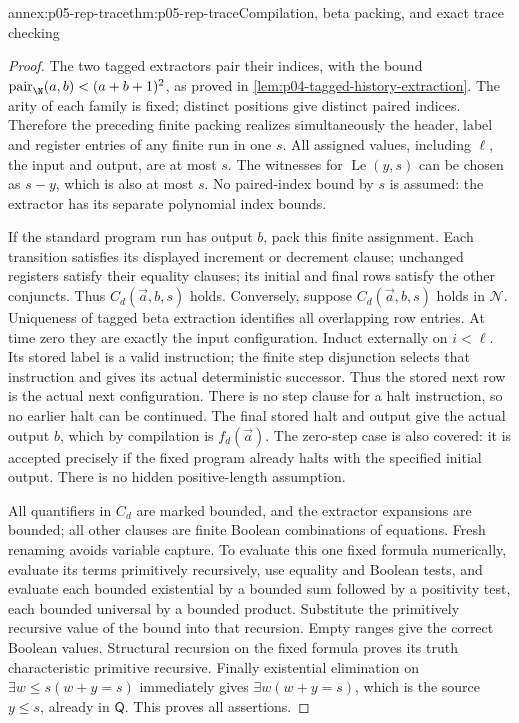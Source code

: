 \begin{annexitem}{annex:p05-rep-trace}{thm:p05-rep-trace}{Compilation, beta packing, and exact trace checking}
\begin{proof}
The two tagged extractors pair their indices, with the bound
\(\operatorname{pair}_{\N}(a,b)<(a+b+1)^2\), as proved in
\cref{lem:p04-tagged-history-extraction}. The arity of each family is
fixed; distinct positions give distinct paired indices. Therefore the
preceding finite packing realizes simultaneously the header, label and
register entries of any finite run in one \(s\). All assigned values,
including \(\ell\), the input and output, are at most \(s\).
The witnesses for \(\operatorname{Le}(y,s)\) can be chosen as \(s-y\),
which is also at most \(s\). No paired-index bound by \(s\) is assumed:
the extractor has its separate polynomial index bounds.

If the standard program run has output \(b\), pack this finite assignment.
Each transition satisfies its displayed increment or decrement clause;
unchanged registers satisfy their equality clauses; its initial and final
rows satisfy the other conjuncts. Thus \(C_d(\vec a,b,s)\) holds.
Conversely, suppose \(C_d(\vec a,b,s)\) holds in \(\mathcal N\).
Uniqueness of tagged beta extraction identifies all overlapping row
entries. At time zero they are exactly the input configuration. Induct
externally on \(i<\ell\). Its stored label is a valid instruction;
the finite step disjunction selects that instruction and gives its actual
deterministic successor. Thus the stored next row is the actual next
configuration. There is no step clause for a halt instruction, so no
earlier halt can be continued. The final stored halt and output give the
actual output \(b\), which by compilation is \(f_d(\vec a)\).
The zero-step case is also covered: it is accepted precisely if the fixed
program already halts with the specified initial output. There is no
hidden positive-length assumption.

All quantifiers in \(C_d\) are marked bounded, and the extractor
expansions are bounded; all other clauses are finite Boolean combinations
of equations. Fresh renaming avoids variable capture. To evaluate this
one fixed formula numerically, evaluate its terms primitively recursively,
use equality and Boolean tests, and evaluate each bounded existential by
a bounded sum followed by a positivity test, each bounded universal by a
bounded product. Substitute the primitively recursive value of the bound
into that recursion. Empty ranges give the correct Boolean values.
Structural recursion on the fixed formula proves its truth characteristic
primitive recursive. Finally existential elimination on
\(\exists w\leq s(w+y=s)\) immediately gives
\(\exists w(w+y=s)\), which is the source \(y\leq s\), already in
\(\mathsf Q\). This proves all assertions.
\end{proof}
\end{annexitem}

